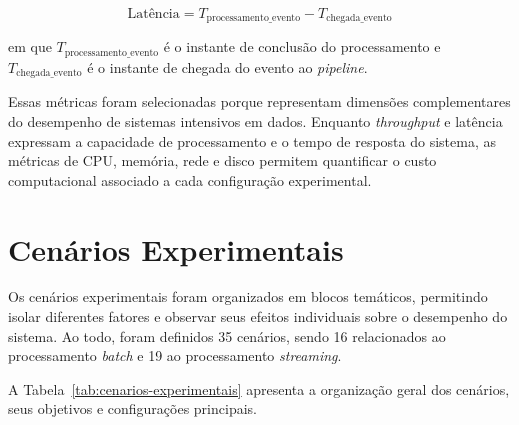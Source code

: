 \begin{equation}
\text{Latência} = T_{\text{processamento\_evento}} - T_{\text{chegada\_evento}}
\label{eq:latencia}
\end{equation}
 
\noindent em que $T_{\text{processamento\_evento}}$ é o instante de conclusão do processamento e $T_{\text{chegada\_evento}}$ é o instante de chegada do evento ao \textit{pipeline}.
 
Essas métricas foram selecionadas porque representam dimensões complementares do desempenho de sistemas intensivos em dados. Enquanto \textit{throughput} e latência expressam a capacidade de processamento e o tempo de resposta do sistema, as métricas de CPU, memória, rede e disco permitem quantificar o custo computacional associado a cada configuração experimental.
 
\section{Cenários Experimentais}
\label{sec:cenarios-experimentais}
 
Os cenários experimentais foram organizados em blocos temáticos, permitindo isolar diferentes fatores e observar seus efeitos individuais sobre o desempenho do sistema. Ao todo, foram definidos 35 cenários, sendo 16 relacionados ao processamento \textit{batch} e 19 ao processamento \textit{streaming}.
 
A Tabela~\ref{tab:cenarios-experimentais} apresenta a organização geral dos cenários, seus objetivos e configurações principais.
 
